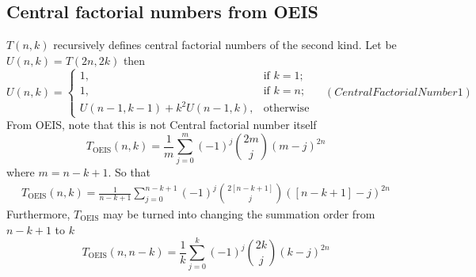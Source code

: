\subsection{Central factorial numbers from OEIS}\label{subsec:central-factorial-numbers-from-oeis}
$T(n,k)$ recursively defines central factorial numbers of the second kind.
Let be $U(n,k) = T(2n,2k)$ then
\begin{equation*}
    U(n,k) = \begin{cases}
                 1, & \text{if } k=1; \\
                 1, & \text{if } k=n; \\
                 U(n-1, k-1) + k^2 U(n-1, k), & \text{otherwise}
    \end{cases} \quad
    (CentralFactorialNumber1)
\end{equation*}
From OEIS, note that this is not Central factorial number itself
\begin{equation*}
    T_{\mathrm{OEIS}} (n,k) = \frac{1}{m} \sum_{j=0}^{m} (-1)^{j} \binom{2m}{j} (m-j)^{2n}
\end{equation*}
where $m=n-k+1$.
So that
\begin{equation}
    \begin{split}
        T_{\mathrm{OEIS}} (n,k) = \frac{1}{n-k+1} \sum_{j=0}^{n-k+1} (-1)^{j} \binom{2[n-k+1]}{j} ([n-k+1]-j)^{2n}
    \end{split}\label{eq:luschny-oeis}
\end{equation}
Furthermore, $T_{\mathrm{OEIS}}$ may be turned into changing the summation order from $n-k+1$ to $k$
\begin{equation*}
    T_{\mathrm{OEIS}} (n, n-k) = \frac{1}{k} \sum_{j=0}^{k} (-1)^{j} \binom{2k}{j} (k-j)^{2n}
\end{equation*}